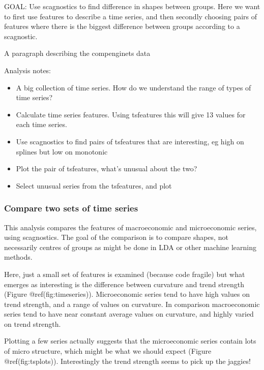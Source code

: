 GOAL: Use scagnostics to find difference in shapes between groups. Here
we want to first use features to describe a time series, and then
secondly choosing pairs of features where there is the biggest
difference between groups according to a scagnostic.

A paragraph describing the compenginets data

Analysis notes:

\begin{itemize}
\tightlist
\item
  A big collection of time series. How do we understand the range of
  types of time series?
\item
  Calculate time series features. Using tsfeatures this will give 13
  values for each time series.
\item
  Use scagnostics to find pairs of tsfeatures that are interesting, eg
  high on splines but low on monotonic
\item
  Plot the pair of tsfeatures, what's unusual about the two?
\item
  Select unusual series from the tsfeatures, and plot
\end{itemize}

\hypertarget{compare-two-sets-of-time-series}{%
\subsubsection{Compare two sets of time
series}\label{compare-two-sets-of-time-series}}

This analysis compares the features of macroeconomic and microeconomic
series, using scagnostics. The goal of the comparison is to compare
shapes, not necessarily centres of groups as might be done in LDA or
other machine learning methods.

Here, just a small set of features is examined (because code fragile)
but what emerges as interesting is the difference between curvature and
trend strength (Figure @ref(fig:timeseries)). Microeconomic series tend
to have high values on trend strength, and a range of values on
curvature. In comparison macroeconomic series tend to have near constant
average values on curvature, and highly varied on trend strength.

Plotting a few series actually suggests that the microeconomic series
contain lots of micro structure, which might be what we should expect
(Figure @ref(fig:tsplots)). Interestingly the trend strength seems to
pick up the jaggies!

